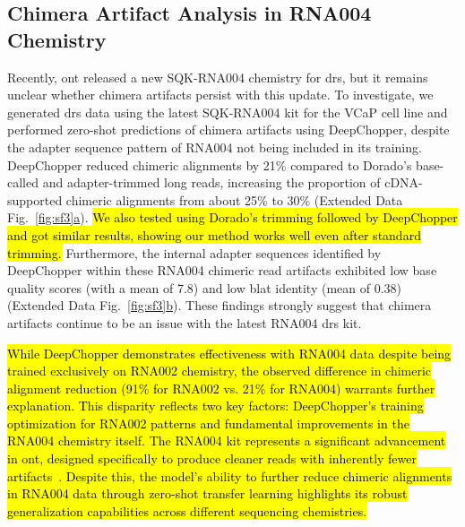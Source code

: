 \documentclass[pdflatex,sn-nature, lineno]{sn-jnl}%
\newcommand{\edfigref}[2]{Extended Data Fig.~\hyperref[#1]{\ref*{#1}#2}}
\begin{document}
\subsection{Chimera Artifact Analysis in RNA004 Chemistry}

Recently, \gls{ont} released a new SQK-RNA004 chemistry for \gls{drs}, but it remains unclear whether chimera artifacts persist with this update.
To investigate, we generated \gls{drs} data using the latest SQK-RNA004 kit for the VCaP cell line and performed zero-shot predictions of chimera artifacts using DeepChopper, despite the adapter sequence pattern of RNA004 not being included in its training.
DeepChopper reduced chimeric alignments by 21\% compared to Dorado's base-called and adapter-trimmed long reads, increasing the proportion of cDNA-supported chimeric alignments from about 25\% to 30\% (\edfigref{fig:sf3}{a}).
\hl{We also tested using Dorado's trimming followed by DeepChopper and got similar results, showing our method works well even after standard trimming.}
Furthermore, the internal adapter sequences identified by DeepChopper within these RNA004 chimeric read artifacts exhibited low base quality scores (with a mean of 7.8) and low \gls{blat} identity (mean of 0.38) (\edfigref{fig:sf3}{b}).
These findings strongly suggest that chimera artifacts continue to be an issue with the latest RNA004 \gls{drs} kit.

\hl{While DeepChopper demonstrates effectiveness with RNA004 data despite being trained exclusively on RNA002 chemistry, the observed difference in chimeric alignment reduction (91\% for RNA002 vs. 21\% for RNA004) warrants further explanation.
	This disparity reflects two key factors: DeepChopper's training optimization for RNA002 patterns and fundamental improvements in the RNA004 chemistry itself.
	The RNA004 kit represents a significant advancement in \mbox{\gls{ont}}, designed specifically to produce cleaner reads with inherently fewer artifacts\mbox{~\cite{hewel2024direct}}.
	Despite this, the model's ability to further reduce chimeric alignments in RNA004 data through zero-shot transfer learning highlights its robust generalization capabilities across different sequencing chemistries.}
\end{document}
